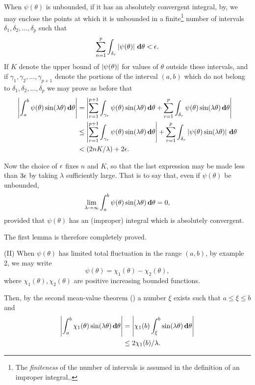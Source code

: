When $\psi(\theta)$ is unbounded, if it has an absolutely convergent integral,
by, we may enclose the points at which it is unbounded in a
finite\footnote{The \emph{finiteness} of the number of intervals is assumed in the
definition of an improper integral,.} number
%
%
of intervals $\delta_{1}, \delta_{2}, \ldots, \delta_{p}$ such that
$$
\sum_{n=1}^{p}
\int_{\delta_{r}}
\left|  \psi(\theta)  \right| \, \mathbf{d} \theta
<
\epsilon.
$$
If $K$ denote the upper bound of $\left| \psi(\theta) \right|$ for values of
$\theta$ outside these intervals, and if
$\gamma_{1}, \gamma_{2}, \ldots, \gamma_{p+1}$ denote the portions of the interval
$(a, b)$ which do not belong to $\delta_{1}, \delta_{2}, \ldots, \delta_{p}$
we may prove as before that
\begin{align*}
  \left| \int_{a}^{b} \psi(\theta) \sin (\lambda \theta) \, \mathbf{d} \theta \right|
  & =
  \left| 
    \sum_{r=1}^{p+1}
    \int_{\gamma_{r}} \psi(\theta) \sin(\lambda \theta) \, \mathbf{d} \theta
    +
    \sum_{r=1}^{p}
    \int_{\delta_{r}} \psi(\theta) \sin(\lambda \theta) \, \mathbf{d} \theta
   \right|
  \\
  & \leq
  \left| 
    \sum_{r=1}^{p+1}
    \int_{\gamma_{r}} \psi(\theta) \sin(\lambda \theta) \, \mathbf{d} \theta
   \right|
  +
  \sum_{r=1}^{p}
  \int_{\delta_{r}}
  \left| \psi(\theta) \sin(\lambda \theta) \right|
  \, \mathbf{d} \theta
  \\
  & <
  (2nK / \lambda) + 2 \epsilon.
\end{align*}

Now the choice of $\epsilon$ fixes $n$ and $K$, so that the last expression may be
made less than $3\epsilon$ by taking $\lambda$ sufficiently large. That is to say
that, even if $\psi(\theta)$ be unbounded,
$$
\lim_{\lambda \rightarrow \infty}
\int_{a}^{b} \psi(\theta) \sin(\lambda \theta) \, \mathbf{d} \theta
=
0,
$$
provided that $\psi(\theta)$ has an (improper) integral which is absolutely
convergent.

The first lemma is therefore completely proved.

(II) When $\psi(\theta)$ has limited total fluctuation in the range $(a, b)$,
by %
 example 2, we may write
$$
\psi(\theta) = \chi_{1}(\theta) - \chi_{2}(\theta),
$$
where $\chi_{1}(\theta), \chi_{2}(\theta)$ are positive increasing bounded functions.

Then, by the second mean-value theorem () a number
$\xi$ exists such that $a \leq \xi \leq b$ and
\begin{align*}
  \left| 
    \int_{a}^{b} \chi_{1}(\theta) \sin(\lambda \theta) \, \mathbf{d} \theta
   \right|
  &=
  \left| 
    \chi_{1}(b) \int_{\xi}^{b} \sin(\lambda \theta) \, \mathbf{d} \theta
   \right|
  \\
  & \leq
  2 \chi_{1}(b) / \lambda.
\end{align*}

